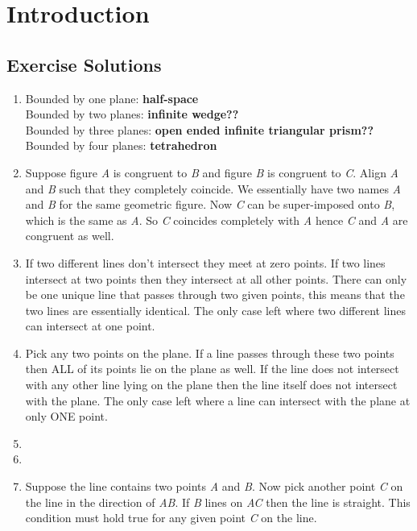 \chapter{Introduction}

\section*{Exercise Solutions}

\begin{enumerate}
	\item Bounded by one plane: \textbf{half-space} \\
	Bounded by two planes: \textbf{infinite wedge??} \\
	Bounded by three planes: \textbf{open ended infinite triangular prism??} \\
	Bounded by four planes: \textbf{tetrahedron}
	
	\item Suppose figure \textit{A} is congruent to \textit{B} and figure \textit{B} is congruent to \textit{C}. Align \textit{A} and \textit{B} such that they completely coincide. We essentially have two names \textit{A} and \textit{B} for the same geometric figure. Now \textit{C} can be super-imposed onto \textit{B}, which is the same as \textit{A}. So \textit{C} coincides completely with \textit{A} hence \textit{C} and \textit{A} are congruent as well.
	
	\item If two different lines don't intersect they meet at zero points. If two lines intersect at two points then they intersect at all other points. There can only be one unique line that passes through two given points, this means that the two lines are essentially identical. The only case left where two different lines can intersect at one point.
	
	\item Pick any two points on the plane. If a line passes through these two points then ALL of its points lie on the plane as well. If the line does not intersect with any other line lying on the plane then the line itself does not intersect with the plane. The only case left where a line can intersect with the plane at only ONE point.
	
	\item 
	
	\item
	
	\item Suppose the line contains two points \textit{A} and \textit{B}. Now pick another point \textit{C} on the line in the direction of \textit{AB}. If \textit{B} lines on \textit{AC} then the line is straight. This condition must hold true for any given point \textit{C} on the line.
	

\end{enumerate}
